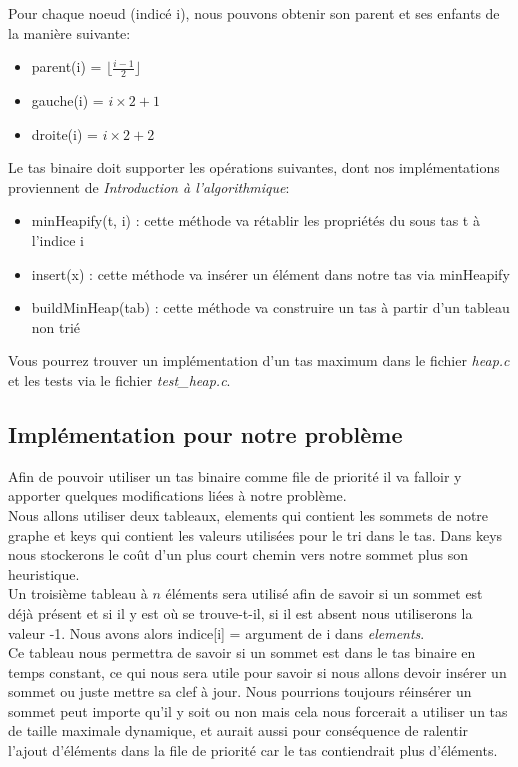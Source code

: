 \documentclass{article}
\begin{document}
Pour chaque noeud (indicé i), nous pouvons obtenir son parent et ses enfants
de la manière suivante:\\
\begin{itemize}
	\item parent(i)  = $\lfloor \frac{i-1}{2}  \rfloor$
	\item gauche(i) = $i \times 2 + 1$
	\item droite(i) = $i \times 2 + 2 $\\ 
\end{itemize}

Le tas binaire doit supporter les opérations suivantes, dont nos implémentations proviennent de 
\textit{Introduction à l'algorithmique}:
\begin{itemize}
	\item minHeapify(t, i) : cette méthode va rétablir les propriétés du sous tas t à l'indice i
	\item insert(x) : cette méthode va insérer un élément dans notre tas via minHeapify
	\item buildMinHeap(tab) : cette méthode va construire un tas à partir d'un tableau non trié\\
\end{itemize}

Vous pourrez trouver un implémentation d'un tas maximum dans le fichier \textit{heap.c} et 
les tests via le fichier \textit{test\_heap.c}.

\subsection{Implémentation pour notre problème}

Afin de pouvoir utiliser un tas binaire comme file de priorité il va falloir y apporter quelques
modifications liées à notre problème.\\

Nous allons utiliser deux tableaux, elements qui contient les sommets de notre graphe
et keys qui contient les valeurs utilisées pour le tri dans le tas. Dans keys nous
stockerons le coût d'un plus court chemin vers notre sommet plus son heuristique.\\

Un troisième tableau à $n$ éléments sera utilisé afin de savoir si un sommet est
déjà présent et si il y est où se trouve-t-il, si il est absent nous utiliserons la valeur -1.
Nous avons alors indice[i] = argument de i dans \textit{elements}.\\
Ce tableau nous permettra de savoir si un sommet est dans le tas binaire en temps constant,
ce qui nous sera utile pour savoir si nous allons devoir insérer un sommet ou juste 
mettre sa clef à jour. Nous pourrions toujours réinsérer un sommet peut importe qu'il y soit ou
non mais cela nous forcerait a utiliser un tas de taille maximale dynamique, et aurait aussi
pour conséquence de ralentir l'ajout d'éléments dans la file de priorité car le tas 
contiendrait plus d'éléments.\\
\end{document}
